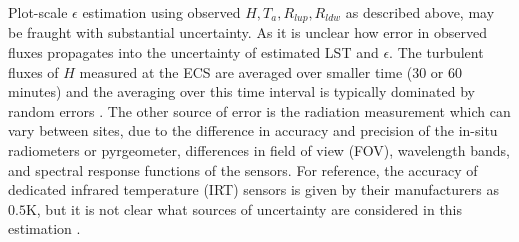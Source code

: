 \documentclass[fleqn,10pt]{wlscirep}
\begin{document}
Plot-scale $\epsilon$ estimation using observed $H, T_{a}, R_{lup}, R_{ldw}$ as described above, may be fraught with substantial uncertainty. As it is unclear how error in observed fluxes propagates into the uncertainty of  estimated LST and $\epsilon$. The turbulent fluxes of $H$ measured at the ECS are averaged over smaller time (30 or 60 minutes) and the averaging over this time interval is typically dominated by random errors \cite{rannik2016random, mauder2020surface}. The other source of error is the radiation measurement which can vary between sites, due to the difference in accuracy and precision of the in-situ radiometers or pyrgeometer, differences in field of view (FOV), wavelength bands, and spectral response functions of the sensors. For reference, the accuracy of dedicated infrared temperature (IRT) sensors is given by their manufacturers as $0.5$K, but it is not clear what sources of uncertainty are considered in this estimation \cite{vickers2010uncertainty}.
\end{document}
